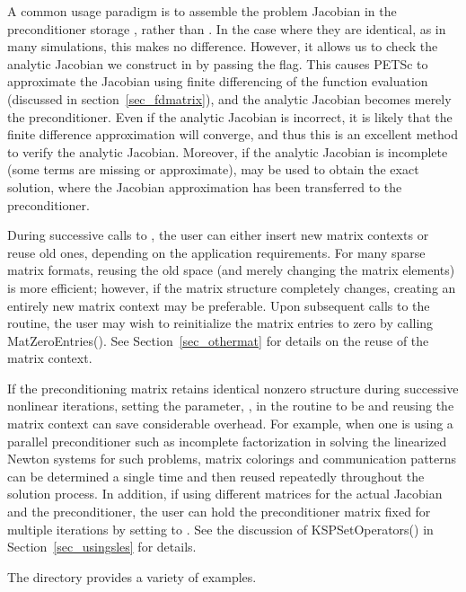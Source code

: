 A common usage paradigm is to assemble the problem Jacobian in the
preconditioner storage , rather than . In the case where they are
identical, as in many simulations, this makes no difference. However, it allows
us to check the analytic Jacobian we construct in  by
passing the  flag. This causes PETSc to approximate the
Jacobian using finite differencing of the function evaluation (discussed in
section~\ref{sec_fdmatrix}), and the analytic Jacobian becomes merely the
preconditioner. Even if the analytic Jacobian is incorrect, it is likely that
the finite difference approximation will converge, and thus this is an excellent
method to verify the analytic Jacobian. Moreover, if the analytic Jacobian is
incomplete (some terms are missing or approximate),  may
be used to obtain the exact solution, where the Jacobian approximation has been
transferred to the preconditioner.

During successive calls to , the user can either
insert new matrix contexts or reuse old ones, depending on the
application requirements. For many sparse matrix formats, reusing the
old space (and merely changing the matrix elements) is more efficient;
however, if the matrix structure completely changes, creating an
entirely new matrix context may be preferable.  
Upon subsequent calls to the 
 routine, the user may wish to reinitialize the matrix
entries to zero by calling MatZeroEntries().  See
Section~\ref{sec_othermat} for details on the reuse of the matrix
context.

If the preconditioning matrix retains identical nonzero structure
during successive nonlinear iterations, setting the parameter, ,
in the  routine to be  
 and reusing the matrix context can save
considerable overhead.  For example, when one is using a parallel
preconditioner such as incomplete factorization in solving the
linearized Newton systems for such problems, matrix colorings and
communication patterns can be determined a single time and then reused
repeatedly throughout the solution process.  In addition, if using
different matrices for the actual Jacobian and the preconditioner, the
user can hold the preconditioner matrix fixed for multiple iterations
by setting  to .  See the
discussion of KSPSetOperators() in Section~\ref{sec_usingsles} for
details.

The directory  provides
a variety of examples.


